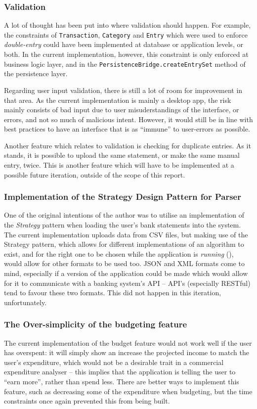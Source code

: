 \subsubsection{Validation} \label{sec:Reflections.TimeConstraints.Validation} 
A lot of thought has been put into where validation should happen. For example,
the constraints of \texttt{Transaction}, \texttt{Category} and \texttt{Entry}
which were used to enforce \emph{double-entry} could have been implemented at
database or application levels, or both. In the current implementation,
however, this constraint is only enforced at business logic layer, and in the
\texttt{PersistenceBridge.createEntrySet} method of the persistence layer.

Regarding user input validation, there is still a lot of room for improvement
in that area. As the current implementation is mainly a desktop app, the risk
mainly consists of bad input due to user misuderstandings of the interface, or
errors, and not so much of malicious intent. However, it would still be in line
with best practices to have an interface that is as ``immune'' to user-errors as
possible.

Another feature which relates to validation is checking for duplicate entries.
As it stands, it is possible to upload the same statement, or make the same
manual entry, twice. This is another feature which will have to be implemented
at a possible future iteration, outside of the scope of this report.


\subsubsection{Implementation of the Strategy Design Pattern for Parser}
One of the original intentions of the author was to utilise an implementation
of the \emph{Strategy} pattern when loading the user's bank statements into the
system. The current implementation uploads data from CSV files, but making use
of the Strategy pattern, which allows for different implementations of an
algorithm to exist, and for the right one to be chosen while the application is
\emph{running} (\cite[][Ch.~8,~Location~3152]{nikolov2016scala}), would allow
for other formats to be used too. JSON and XML formats come to mind, especially
if a version of the application could be made which would allow for it to
communicate with a banking system's API -- API's (especially RESTful) tend to
favour these two formats. This did not happen in this iteration, unfortunately.

\subsubsection{The Over-simplicity of the budgeting feature}
The current implementation of the budget feature would not work well if
the user has overspent: it will simply show an increase the projected income to
match the user's expenditure, which would not be a desirable trait in a
commercial expenditure analyser -- this implies that the application is telling
the user to ``earn more'', rather than spend less. There are better ways to
implement this feature, such as decreasing some of the expenditure when
budgeting, but the time constraints once again prevented this from being built.


